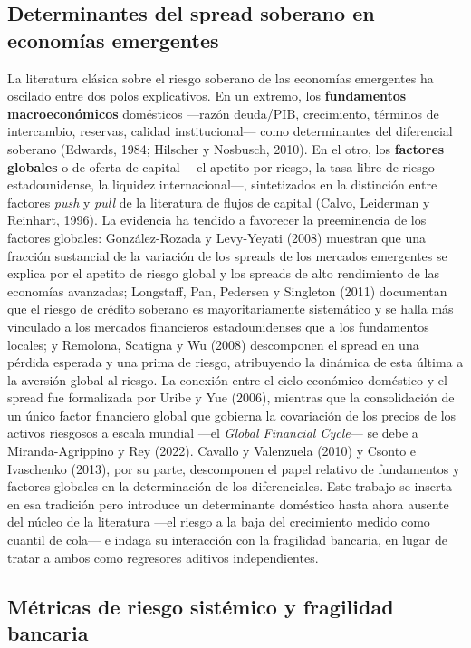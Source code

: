 \documentclass[5p,times,twocolumn,authoryear]{elsarticle}
\begin{document}
\subsection{Determinantes del spread soberano en economías emergentes}

La literatura clásica sobre el riesgo soberano de las economías emergentes ha oscilado entre dos polos explicativos. En un extremo, los \textbf{fundamentos macroeconómicos} domésticos —razón deuda/PIB, crecimiento, términos de intercambio, reservas, calidad institucional— como determinantes del diferencial soberano (Edwards, 1984; Hilscher y Nosbusch, 2010). En el otro, los \textbf{factores globales} o de oferta de capital —el apetito por riesgo, la tasa libre de riesgo estadounidense, la liquidez internacional—, sintetizados en la distinción entre factores \textit{push} y \textit{pull} de la literatura de flujos de capital (Calvo, Leiderman y Reinhart, 1996). La evidencia ha tendido a favorecer la preeminencia de los factores globales: González-Rozada y Levy-Yeyati (2008) muestran que una fracción sustancial de la variación de los spreads de los mercados emergentes se explica por el apetito de riesgo global y los spreads de alto rendimiento de las economías avanzadas; Longstaff, Pan, Pedersen y Singleton (2011) documentan que el riesgo de crédito soberano es mayoritariamente sistemático y se halla más vinculado a los mercados financieros estadounidenses que a los fundamentos locales; y Remolona, Scatigna y Wu (2008) descomponen el spread en una pérdida esperada y una prima de riesgo, atribuyendo la dinámica de esta última a la aversión global al riesgo. La conexión entre el ciclo económico doméstico y el spread fue formalizada por Uribe y Yue (2006), mientras que la consolidación de un único factor financiero global que gobierna la covariación de los precios de los activos riesgosos a escala mundial —el \textit{Global Financial Cycle}— se debe a Miranda-Agrippino y Rey (2022). Cavallo y Valenzuela (2010) y Csonto e Ivaschenko (2013), por su parte, descomponen el papel relativo de fundamentos y factores globales en la determinación de los diferenciales. Este trabajo se inserta en esa tradición pero introduce un determinante doméstico hasta ahora ausente del núcleo de la literatura —el riesgo a la baja del crecimiento medido como cuantil de cola— e indaga su interacción con la fragilidad bancaria, en lugar de tratar a ambos como regresores aditivos independientes.

\subsection{Métricas de riesgo sistémico y fragilidad bancaria}
\end{document}
